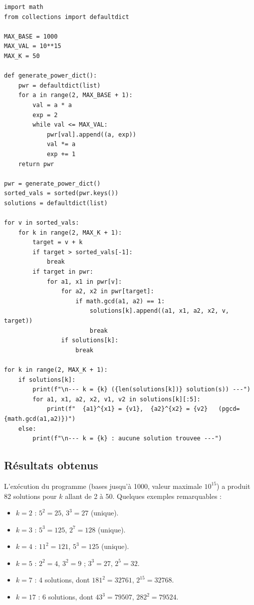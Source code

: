 \documentclass[12pt,a4paper]{article}
\theoremstyle{plain}
\theoremstyle{definition}
\begin{document}
\begin{lstlisting}[caption={Script d'exploration des solutions de $|a^x - b^y| = k$},label={lst:python}]
import math
from collections import defaultdict

MAX_BASE = 1000
MAX_VAL = 10**15
MAX_K = 50

def generate_power_dict():
    pwr = defaultdict(list)
    for a in range(2, MAX_BASE + 1):
        val = a * a
        exp = 2
        while val <= MAX_VAL:
            pwr[val].append((a, exp))
            val *= a
            exp += 1
    return pwr

pwr = generate_power_dict()
sorted_vals = sorted(pwr.keys())
solutions = defaultdict(list)

for v in sorted_vals:
    for k in range(2, MAX_K + 1):
        target = v + k
        if target > sorted_vals[-1]:
            break
        if target in pwr:
            for a1, x1 in pwr[v]:
                for a2, x2 in pwr[target]:
                    if math.gcd(a1, a2) == 1:
                        solutions[k].append((a1, x1, a2, x2, v, target))
                        break
                if solutions[k]:
                    break

for k in range(2, MAX_K + 1):
    if solutions[k]:
        print(f"\n--- k = {k} ({len(solutions[k])} solution(s)) ---")
        for a1, x1, a2, x2, v1, v2 in solutions[k][:5]:
            print(f"  {a1}^{x1} = {v1},  {a2}^{x2} = {v2}   (pgcd={math.gcd(a1,a2)})")
    else:
        print(f"\n--- k = {k} : aucune solution trouvee ---")
\end{lstlisting}

\subsection{Résultats obtenus}

L'exécution du programme (bases jusqu'à 1000, valeur maximale $10^{15}$) a produit 82 solutions pour $k$ allant de 2 à 50. Quelques exemples remarquables :

\begin{itemize}
    \item $k=2$ : $5^2 = 25$, $3^3 = 27$ (unique).
    \item $k=3$ : $5^3 = 125$, $2^7 = 128$ (unique).
    \item $k=4$ : $11^2 = 121$, $5^3 = 125$ (unique).
    \item $k=5$ : $2^2 = 4$, $3^2 = 9$ ; $3^3 = 27$, $2^5 = 32$.
    \item $k=7$ : 4 solutions, dont $181^2 = 32761$, $2^{15} = 32768$.
    \item $k=17$ : 6 solutions, dont $43^3 = 79507$, $282^2 = 79524$.
\end{itemize}
\end{document}
